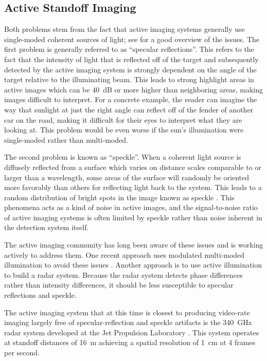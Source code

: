 \subsection{Active Standoff Imaging}

Both problems stem from the fact that active imaging systems generally use single-moded coherent sources of light; see \cite{petkie_active_2008} for a good overview of the issues.
The first problem is generally referred to as ``specular reflections''.
This refers to the fact that the intensity of light that is reflected off of the target and subsequently detected by the active imaging system is strongly dependent on the angle of the target relative to the illuminating beam.
This leads to strong highlight areas in active images which can be \SI{40}{\dB} or more higher than neighboring areas, making images difficult to interpret.
For a concrete example, the reader can imagine the way that sunlight at just the right angle can reflect off of the fender of another car on the road, making it difficult for their eyes to interpret what they are looking at.
This problem would be even worse if the sun's illumination were single-moded rather than multi-moded.

The second problem is known as ``speckle''.
When a coherent light source is diffusely reflected from a surface which varies on distance scales comparable to or larger than a wavelength, some areas of the surface will randomly be oriented more favorably than others for reflecting light back to the system.
This leads to a random distribution of bright spots in the image known as speckle \cite{goodman_fundamental_1976}.
This phenomena acts as a kind of noise in active images, and the signal-to-noise ratio of active imaging systems is often limited by speckle rather than noise inherent in the detection system itself.

The active imaging community has long been aware of these issues and is working actively to address them.
One recent approach uses modulated multi-moded illumination to avoid these issues \cite{petkie_multimode_2012,patrick_elimination_2012}.
Another approach is to use active illumination to build a radar system.
Because the radar system detects phase differences rather than intensity differences, it should be less susceptible to specular reflections and speckle.

The active imaging system that at this time is closest to producing video-rate imaging largely free of specular-reflection and speckle artifacts is the \SI{340}{\GHz} radar system developed at the Jet Propulsion Laboratory \cite{cooper_thz_2011}.
This system operates at standoff distances of \SI{16}{\m} achieving a spatial resolution of \SI{1}{\cm} at 4 frames per second.

